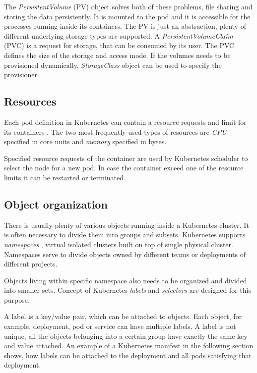 \documentclass[
  digital, %
  twoside, %
  table,   %
  lof,     %
  lot,     %
]{fithesis3}
\begin{document}
The \textit{PersistentVolume} (PV) object solves both of these problems, file sharing and storing the data persistently. It is mounted to the pod and it is accessible for the processes running inside its containers. The PV is just an abstraction, plenty of different underlying storage types are supported. A \textit{PersistentVolumeClaim} (PVC) is a request for storage, that can be consumed by its user. The PVC defines the size of the storage and access mode. If the volumes needs to be provisioned dynamically, \textit{StorageClass} \cite{storage-classes} object can be used to specify the provisioner.

\subsection{Resources} \label{sec:resources}
Each pod definition in Kubernetes can contain a resource requests and limit for its containers \cite{mcrc}. The two most frequently used types of resources are \textit{CPU} specified in core units and \textit{memory} specified in bytes.

Specified resource requests of the container are used by Kubernetes scheduler to select the node for a new pod. In case the container exceed one of the resource limits it can be restarted or terminated.

\subsection{Object organization} \label{sec:obj_organization}
There is usually plenty of various objects running inside a Kubernetes cluster. It is often necessary to divide them into groups and subsets. Kubernetes supports \textit{namespaces} \cite{namespaces}, virtual isolated clusters built on top of single physical cluster. Namespaces serve to divide objects owned by different teams or deployments of different projects.

Objects living within specific namespace also needs to be organized and divided into smaller sets. Concept of Kubernetes \textit{labels} and \textit{selectors} \cite{labels_selectors} are designed for this purpose.

A label is a key/value pair, which can be attached to objects. Each object, for example, deployment, pod or service can have multiple labels. A label is not unique, all the objects belonging into a certain group have exactly the same key and value attached. An example of a Kubernetes manifest in the following section shows, how labels can be attached to the deployment and all pods satisfying that deployment.
\end{document}
